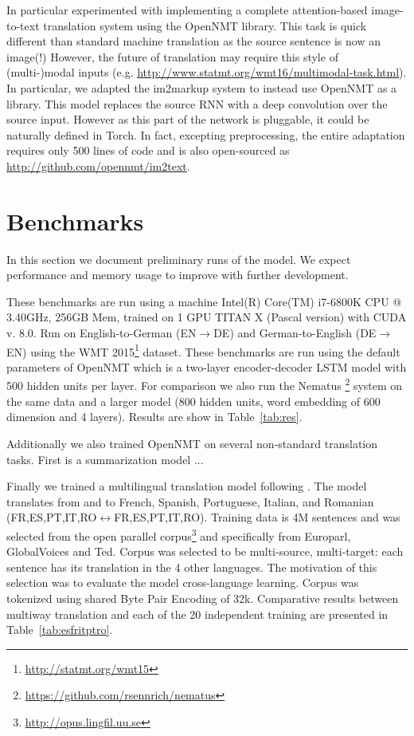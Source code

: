 \documentclass[11pt]{article}
\begin{document}
In particular experimented with implementing a complete
attention-based image-to-text translation system
\cite{DBLP:journals/corr/XuBKCCSZB15} using the OpenNMT library. This
task is quick different than standard machine translation as the
source sentence is now an image(!)  However, the future of translation
may require this style of (multi-)modal inputs
(e.g. \url{http://www.statmt.org/wmt16/multimodal-task.html}). In
particular, we adapted the im2markup system
\cite{DBLP:journals/corr/DengKR16} to instead use OpenNMT as a
library.  This model replaces the source RNN with a deep convolution
over the source input. However as this part of the network is
pluggable, it could be naturally defined in Torch. In fact, excepting
preprocessing, the entire adaptation requires only 500 lines of code
and is also open-sourced as \url{http://github.com/opennmt/im2text}.

\section{Benchmarks}


In this section we document preliminary runs of the model. We expect
performance and memory usage to improve with further development.

These benchmarks are run using a machine Intel(R) Core(TM) i7-6800K CPU @
3.40GHz, 256GB Mem, trained on 1 GPU TITAN X (Pascal version) with
CUDA v. 8.0.  Run on English-to-German (EN$\rightarrow$DE) and
German-to-English (DE$\rightarrow$EN) using the WMT 2015\footnote{\url{http://statmt.org/wmt15}}
dataset. These benchmarks are run using the default parameters of
OpenNMT which is a two-layer encoder-decoder LSTM model with 500
hidden units per layer. For comparison we also run the Nematus \footnote{\url{https://github.com/rsennrich/nematus}} system on 
the same data and a larger model (800 hidden units, word embedding of 600 dimension and 4 layers). Results are show in Table~\ref{tab:res}. 


Additionally we also trained OpenNMT on several non-standard
translation tasks. First is a summarization model \cite{} ...

Finally we trained a multilingual translation model following . The model translates from and to 
French, Spanish, Portuguese, Italian, and Romanian (FR,ES,PT,IT,RO$\leftrightarrow$FR,ES,PT,IT,RO). Training data is 4M sentences and was selected from the open parallel corpus\footnote{\url{http://opus.lingfil.uu.se}} and specifically from Europarl, GlobalVoices and Ted. Corpus was selected to be multi-source, multi-target: each sentence has its translation in the 4 other languages. The motivation of this selection was to evaluate the model cross-language learning. Corpus was tokenized using shared Byte Pair Encoding of 32k.
Comparative results between multiway translation and each of the 20 independent training are presented in Table~\ref{tab:esfritptro}.
\end{document}

